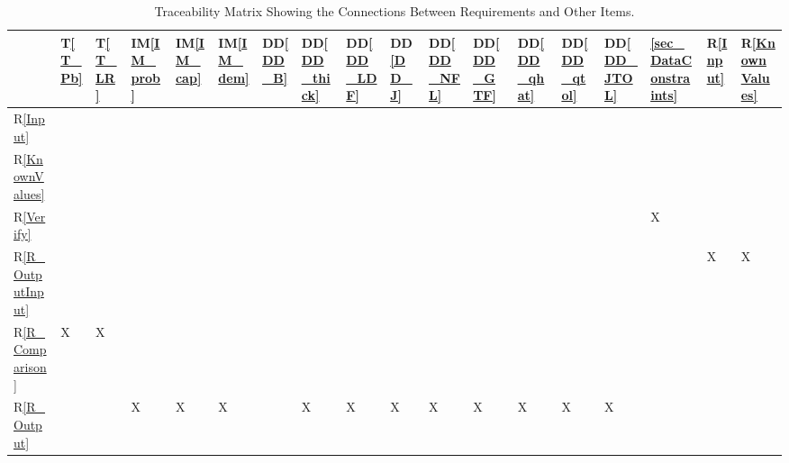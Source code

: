 \documentclass[12pt]{article}
\newcommand{\ddref}[1]{DD\ref{#1}}
\newcommand{\tref}[1]{T\ref{#1}}
\newcommand{\iref}[1]{IM\ref{#1}}
\newcommand{\rref}[1]{R\ref{#1}}
\begin{document}
\newpage

\begin{table}[h!]
\centering
\begin{tabular}{|P{0.4cm}|P{0.4cm}|P{0.4cm}|P{0.6cm}|P{0.6cm}|P{0.6cm}|P{0.65cm}|
P{0.65cm}|P{0.65cm}|P{0.65cm}|P{0.65cm}|P{0.65cm}|P{0.65cm}|P{0.65cm}|P{0.65cm}|
P{0.8cm}|P{0.4cm}|P{0.4cm}|}
\hline
	& \tref{T_Pb} & \tref{T_LR} & \iref{IM_prob} & \iref{IM_cap} &
	\iref{IM_dem} & \ddref{DD_B} & \ddref{DD_thick} & \ddref{DD_LDF} &
	\ddref{DD_J} & \ddref{DD_NFL} & \ddref{DD_GTF} & \ddref{DD_qhat} &
	\ddref{DD_qtol} & \ddref{DD_JTOL} & \ref{sec_DataConstraints} &
	\rref{Input} & \rref{KnownValues}\\
\hline
\rref{Input}                 & & & & & & & & & & & & & & & & & \\ \hline
\rref{KnownValues}   & & & & & & & & & & & & & & & & & \\ \hline
\rref{Verify}                & & & & & & & & & & & & & & & X & & \\ \hline
\rref{R_OutputInput}  & & & & & & & & & & & & & & & & X & X \\ \hline
\rref{R_ Comparison}  & X & X & & & & & & & & & & & & & & & \\ \hline
\rref{R_Output}          & & & X & X & X & & X & X & X & X & X & X & X & X & & & \\
\hline
\end{tabular}
\caption{Traceability Matrix Showing the Connections Between Requirements and Other Items.}
\label{Table:R_trace}
\end{table}

\newpage
\end{document}
